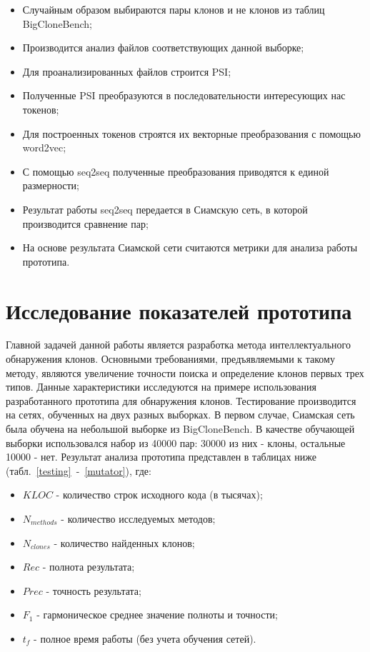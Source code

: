 \begin{itemize}
\setlength\itemsep{0mm}
\item Случайным образом выбираются пары клонов и не клонов из таблиц BigCloneBench;
\item Производится анализ файлов соответствующих данной выборке;
\item Для проанализированных файлов строится PSI;
\item Полученные PSI преобразуются в последовательности интересующих нас токенов;
\item Для построенных токенов строятся их векторные преобразования с помощью word2vec;
\item С помощью seq2seq полученные преобразования приводятся к единой размерности;
\item Результат работы seq2seq передается в Сиамскую сеть, в которой производится сравнение пар;
\item На основе результата Сиамской сети считаются метрики для анализа работы прототипа.
\end{itemize}

\section{Исследование показателей прототипа}

Главной задачей данной работы является разработка метода интеллектуального обнаружения клонов. Основными требованиями, предъявляемыми к такому методу, являются увеличение точности поиска и определение клонов первых трех типов. Данные характеристики исследуются на примере использования разработанного прототипа для обнаружения клонов. Тестирование производится на сетях, обученных на двух разных выборках. В первом случае, Сиамская сеть была обучена на небольшой выборке из BigCloneBench. В качестве обучающей выборки использовался набор из 40000 пар: 30000 из них - клоны, остальные 10000 - нет. Результат анализа прототипа представлен в таблицах ниже (табл.~\ref{testing}~-~\ref{mutator}), где:

\begin{itemize}
\setlength\itemsep{0mm}
\item \(KLOC\) - количество строк исходного кода (в тысячах);
\item \(N_{methods}\) - количество исследуемых методов;
\item \(N_{clones}\) - количество найденных клонов;
\item \(Rec\) - полнота результата;
\item \(Prec\) - точность результата;
\item \(F_1\) - гармоническое среднее значение полноты и точности;
\item \(t_f\) - полное время работы (без учета обучения сетей).
\end{itemize}

